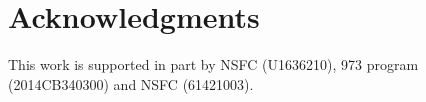 \documentclass[twocolumn]{svjour3}          %
\begin{document}











\section*{Acknowledgments}
This work is supported in part by NSFC (U1636210), 973 program ({2014CB340300}) and NSFC ({61421003}).







\end{document}
